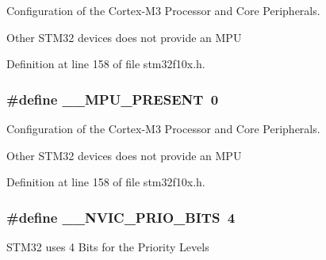 Configuration of the Cortex-\/\+M3 Processor and Core Peripherals. 

Other S\+T\+M32 devices does not provide an M\+PU 

Definition at line 158 of file stm32f10x.\+h.

\subsubsection[{\texorpdfstring{\+\_\+\+\_\+\+M\+P\+U\+\_\+\+P\+R\+E\+S\+E\+NT}{__MPU_PRESENT}}]{\setlength{\rightskip}{0pt plus 5cm}\#define \+\_\+\+\_\+\+M\+P\+U\+\_\+\+P\+R\+E\+S\+E\+NT~0}\hypertarget{group___configuration__section__for___c_m_s_i_s_ga4127d1b31aaf336fab3d7329d117f448}{}\label{group___configuration__section__for___c_m_s_i_s_ga4127d1b31aaf336fab3d7329d117f448}


Configuration of the Cortex-\/\+M3 Processor and Core Peripherals. 

Other S\+T\+M32 devices does not provide an M\+PU 

Definition at line 158 of file stm32f10x.\+h.

\subsubsection[{\texorpdfstring{\+\_\+\+\_\+\+N\+V\+I\+C\+\_\+\+P\+R\+I\+O\+\_\+\+B\+I\+TS}{__NVIC_PRIO_BITS}}]{\setlength{\rightskip}{0pt plus 5cm}\#define \+\_\+\+\_\+\+N\+V\+I\+C\+\_\+\+P\+R\+I\+O\+\_\+\+B\+I\+TS~4}\hypertarget{group___configuration__section__for___c_m_s_i_s_gae3fe3587d5100c787e02102ce3944460}{}\label{group___configuration__section__for___c_m_s_i_s_gae3fe3587d5100c787e02102ce3944460}
S\+T\+M32 uses 4 Bits for the Priority Levels 

